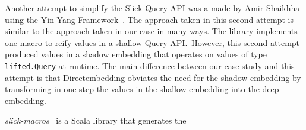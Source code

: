 Another attempt to simplify the Slick Query API was a made by Amir Shaikhha~\autocite{shaikhha_embedded_2014} using the Yin-Yang Framework~\autocite{jovanovic_yin-yang:_2014}.
The approach taken in this second attempt is similar to the approach taken in our case in many ways.
The library implements one macro to reify values in a shallow Query API.\
However, this second attempt produced values in a shadow embedding that operates on values of type \texttt{lifted.Query} at runtime.
The main difference between our case study and this attempt is that Directembedding obviates the need for the shadow embedding by transforming in one step the values in the shallow embedding into the deep embedding.

\emph{slick-macros}~\autocite{ebiznext_slick-macros_2014} is a Scala library that generates the 






